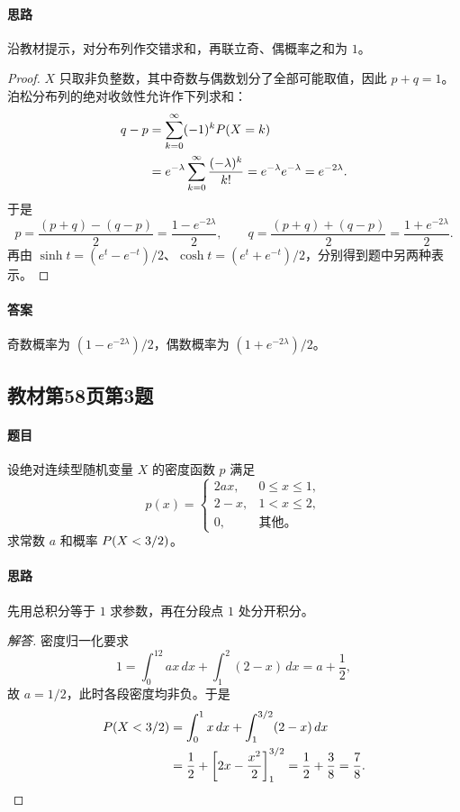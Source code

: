 \paragraph{思路} 沿教材提示，对分布列作交错求和，再联立奇、偶概率之和为 $1$。
\begin{proof}
$X$ 只取非负整数，其中奇数与偶数划分了全部可能取值，因此 $p+q=1$。泊松分布列的绝对收敛性允许作下列求和：
\begin{align*}
q-p
&=\sum_{k=0}^{\infty}(-1)^k\P(X=k)\\
&=e^{-\lambda}\sum_{k=0}^{\infty}\frac{(-\lambda)^k}{k!}
=e^{-\lambda}e^{-\lambda}=e^{-2\lambda}.
\end{align*}
于是
\[
p=\frac{(p+q)-(q-p)}2=\frac{1-e^{-2\lambda}}2,\qquad
q=\frac{(p+q)+(q-p)}2=\frac{1+e^{-2\lambda}}2.
\]
再由 $\sinh t=(e^t-e^{-t})/2$、$\cosh t=(e^t+e^{-t})/2$，分别得到题中另两种表示。
\end{proof}
\paragraph{答案} 奇数概率为 $(1-e^{-2\lambda})/2$，偶数概率为 $(1+e^{-2\lambda})/2$。

\subsection{教材第58页第3题}\label{ex:w07-b58-3}
\paragraph{题目}
设绝对连续型随机变量 $X$ 的密度函数 $p$ 满足
\[
p(x)=\begin{cases}2ax,&0\leq x\leq1,\\2-x,&1<x\leq2,\\0,&\text{其他。}\end{cases}
\]
求常数 $a$ 和概率 $\P(X<3/2)$。
\paragraph{思路} 先用总积分等于 $1$ 求参数，再在分段点 $1$ 处分开积分。
\begin{proof}[解答]
密度归一化要求
\[
1=\int_0^12ax\,dx+\int_1^2(2-x)\,dx=a+\frac12,
\]
故 $a=1/2$，此时各段密度均非负。于是
\begin{align*}
\P(X<3/2)
&=\int_0^1x\,dx+\int_1^{3/2}(2-x)\,dx\\
&=\frac12+\left[2x-\frac{x^2}2\right]_1^{3/2}
=\frac12+\frac38=\frac78.
\end{align*}
\end{proof}
